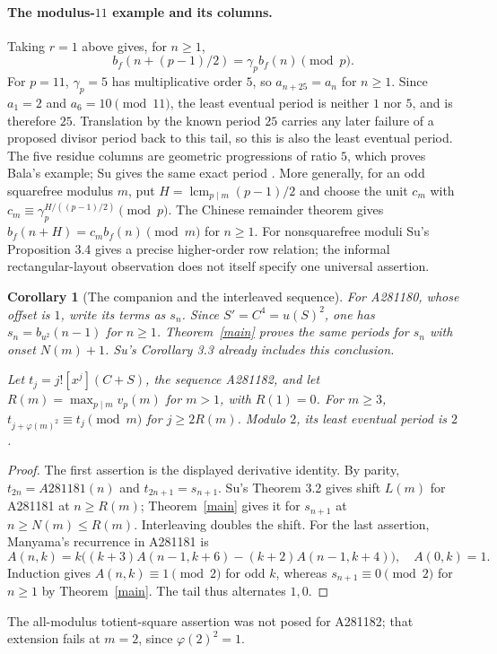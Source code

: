 \documentclass[11pt]{article}
\newtheorem{corollary}{Corollary}
\begin{document}
\paragraph{The modulus-$11$ example and its columns.}
Taking $r=1$ above gives, for $n\ge1$,
\[
 b_f(n+(p-1)/2)=\gamma_pb_f(n)\pmod p.
\]
For $p=11$, $\gamma_p=5$ has multiplicative order $5$, so
$a_{n+25}=a_n$ for $n\ge1$. Since $a_1=2$ and $a_6=10\pmod{11}$,
the least eventual period is neither $1$ nor $5$, and is therefore $25$.
Translation by the known period $25$ carries any later failure
of a proposed divisor period back to this tail, so this is also
the least eventual period. The five residue columns are geometric progressions of ratio $5$,
which proves Bala's example; Su gives the same exact period
\cite[Propositions 3.4 and 3.6]{su}.
More generally, for an odd squarefree modulus $m$, put
$H=\operatorname{lcm}_{p\mid m}(p-1)/2$ and choose the unit $c_m$
with $c_m\equiv\gamma_p^{H/((p-1)/2)}\pmod p$.
The Chinese remainder theorem gives
$b_f(n+H)=c_mb_f(n)\pmod m$ for $n\ge1$.
For nonsquarefree moduli Su's Proposition 3.4 gives a precise
higher-order row relation; the informal rectangular-layout observation
does not itself specify one universal assertion.

\begin{corollary}[The companion and the interleaved sequence]\label{companions}
For A281180, whose offset is $1$, write its terms as $s_n$.
Since $S'=C^4=u(S)^2$, one has
$s_n=b_{u^2}(n-1)$ for $n\ge1$.
Theorem~\ref{main} proves the same periods for $s_n$ with onset
$N(m)+1$. Su's Corollary 3.3 already includes this conclusion.

Let $t_j=j![x^j](C+S)$, the sequence A281182, and let
$R(m)=\max_{p\mid m}v_p(m)$ for $m>1$, with $R(1)=0$.
For $m\ge3$, $t_{j+\varphi(m)^2}\equiv t_j\pmod m$
for $j\ge2R(m)$. Modulo $2$, its least eventual period is $2$.
\end{corollary}
\begin{proof}
The first assertion is the displayed derivative identity.
By parity, $t_{2n}=A281181(n)$ and $t_{2n+1}=s_{n+1}$.
Su's Theorem 3.2 gives shift $L(m)$ for A281181 at $n\ge R(m)$;
Theorem~\ref{main} gives it for $s_{n+1}$ at $n\ge N(m)\le R(m)$.
Interleaving doubles the shift. For the last assertion, Manyama's
recurrence in A281181 is
\[
 A(n,k)=k\bigl((k+3)A(n-1,k+6)-(k+2)A(n-1,k+4)\bigr),
 \quad A(0,k)=1.
\]
Induction gives $A(n,k)\equiv1\pmod2$ for odd $k$, whereas
$s_{n+1}\equiv0\pmod2$ for $n\ge1$ by Theorem~\ref{main}.
The tail thus alternates $1,0$.
\end{proof}
The all-modulus totient-square assertion was not posed for A281182;
that extension fails at $m=2$, since $\varphi(2)^2=1$.
\end{document}
